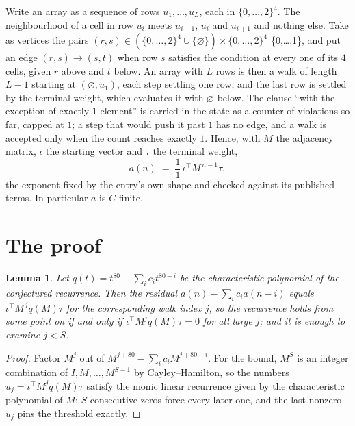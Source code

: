 \documentclass[11pt,a4paper]{article}
\theoremstyle{plain}
\newtheorem{lemma}[theorem]{Lemma}
\theoremstyle{definition}
\begin{document}
Write an array as a sequence of rows $u_1,\dots,u_L$, each in
$\{0,\dots,2\}^{4}$. The neighbourhood of a cell in row $u_i$ meets $u_{i-1}$,
$u_i$ and $u_{i+1}$ and nothing else. Take as vertices the pairs
$(r,s)\in(\{0,\dots,2\}^{4}\cup\{\varnothing\})\times\{0,\dots,2\}^{4}$ \times \{0,\dots,1\},
and put an edge $(r,s)\to(s,t)$ when row $s$ satisfies the condition at every one of its
$4$ cells, given $r$ above and $t$ below. An array with $L$ rows is then a walk of length
$L-1$ starting at $(\varnothing,u_1)$, each step settling one row, and the last row is
settled by the terminal weight, which evaluates it with $\varnothing$ below. The clause ``with the exception of exactly $1$ element'' is carried in
the state as a counter of violations so far, capped at $1$; a step that would push it past
$1$ has no edge, and a walk is accepted only when the count reaches exactly $1$. Hence,
with $M$ the adjacency matrix, $\iota$ the starting vector and $\tau$ the terminal weight,
\[
a(n)\;=\;\frac{1}{1}\,\iota^{\!\top}M^{\,n-1}\tau ,
\]
the exponent fixed by the entry's own shape and checked against its published terms. In
particular $a$ is $C$-finite.

\section{The proof}

\begin{lemma}\label{lem:crit}
Let $q(t)=t^{80}-\sum_i c_it^{80-i}$ be the characteristic polynomial of the
conjectured recurrence. Then the residual $a(n)-\sum_ic_ia(n-i)$ equals
$\iota^{\!\top}M^{\,j}q(M)\tau$ for the corresponding walk index $j$, so the
recurrence holds from some point on if and only if $\iota^{\!\top}M^{j}q(M)\tau=0$ for all
large $j$; and it is enough to examine $j<S$.
\end{lemma}

\begin{proof}
Factor $M^{j}$ out of $M^{j+80}-\sum_ic_iM^{j+80-i}$. For the bound, $M^{S}$
is an integer combination of $I,M,\dots,M^{S-1}$ by Cayley--Hamilton, so the numbers
$u_j=\iota^{\!\top}M^{j}q(M)\tau$ satisfy the monic linear recurrence given by the
characteristic polynomial of $M$; $S$ consecutive zeros force every later one, and the last
nonzero $u_j$ pins the threshold exactly.
\end{proof}
\end{document}
